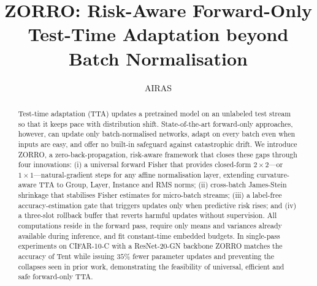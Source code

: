 \documentclass{article} %
\title{ZORRO: Risk-Aware Forward-Only Test-Time Adaptation beyond Batch Normalisation}
\author{AIRAS}
\begin{document}
\maketitle

\begin{abstract}
Test-time adaptation (TTA) updates a pretrained model on an unlabeled test stream so that it keeps pace with distribution shift. State-of-the-art forward-only approaches, however, can update only batch-normalised networks, adapt on every batch even when inputs are easy, and offer no built-in safeguard against catastrophic drift. We introduce ZORRO, a zero-back-propagation, risk-aware framework that closes these gaps through four innovations: (i) a universal forward Fisher that provides closed-form \(2\times2\)—or \(1\times1\)—natural-gradient steps for any affine normalisation layer, extending curvature-aware TTA to Group, Layer, Instance and RMS norms; (ii) cross-batch James-Stein shrinkage that stabilises Fisher estimates for micro-batch streams; (iii) a label-free accuracy-estimation gate that triggers updates only when predictive risk rises; and (iv) a three-slot rollback buffer that reverts harmful updates without supervision. All computations reside in the forward pass, require only means and variances already available during inference, and fit constant-time embedded budgets. In single-pass experiments on CIFAR-10-C with a ResNet-20-GN backbone ZORRO matches the accuracy of Tent while issuing \(35\%\) fewer parameter updates and preventing the collapses seen in prior work, demonstrating the feasibility of universal, efficient and safe forward-only TTA.
\end{abstract}
\end{document}
